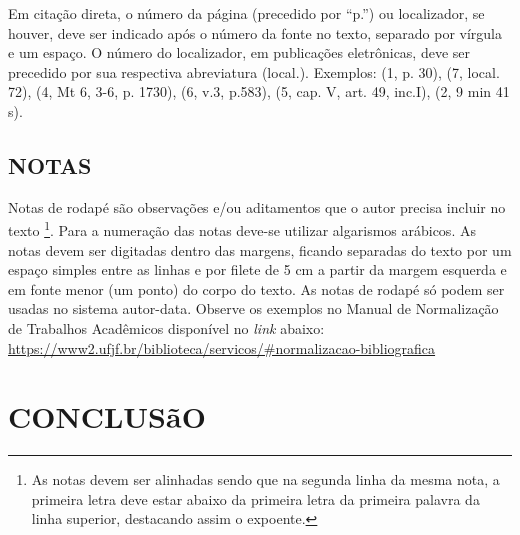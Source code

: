 \documentclass[
        oneside, %
        english,
        brazil
        ]{abntbibufjf}
\begin{document}
Em citação direta, o número da página (precedido por ``p.'') ou localizador, se houver, deve ser indicado após o número da fonte no texto, separado por vírgula e um espaço. O número do localizador, em publicações eletrônicas, deve ser precedido por sua respectiva abreviatura (local.). Exemplos: (1, p. 30), (7, local. 72), (4, Mt 6, 3-6, p. 1730), (6, v.3, p.583), (5, cap. V, art. 49, inc.I), (2, 9 min 41 s).

\section{NOTAS} %

Notas de rodap\'e são observaç\~{o}es e/ou aditamentos que o autor precisa incluir no texto \footnote[2]{As notas devem ser alinhadas sendo que na segunda linha da mesma nota, a primeira letra deve estar abaixo da primeira letra da primeira palavra da linha superior, destacando assim o expoente.}. Para a numeraç\~{a}o das notas deve-se utilizar algarismos arábicos. As notas devem ser digitadas dentro das margens, ficando separadas do texto por um espaço simples entre as linhas e por filete de 5 cm a partir da margem esquerda e em fonte menor (um ponto) do corpo do texto. As notas de rodap\'e só podem ser usadas no sistema autor-data. Observe os exemplos no Manual de Normalizaç\~{a}o de Trabalhos Acadêmicos disponível no \textit{link} abaixo: \\
\url{https://www2.ufjf.br/biblioteca/servicos/#normalizacao-bibliografica}




\chapter{CONCLUSãO} %
\end{document}
